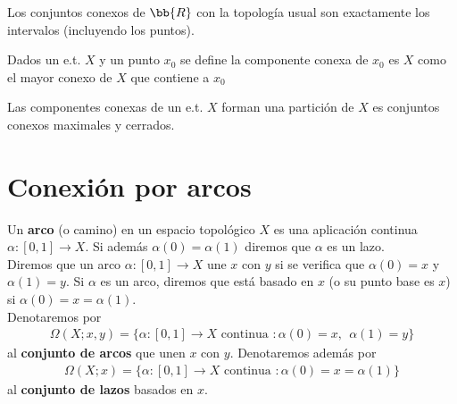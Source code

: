 \begin{teo}
    Los conjuntos conexos de $\bb{R}$ con la topología usual son exactamente los intervalos (incluyendo los puntos).
\end{teo}

\begin{definicion}
    Dados un e.t. $X$ y un punto $x_0$ se define la componente conexa de $x_0$ es $X$ como el mayor conexo de $X$ que contiene a $x_0$
\end{definicion}

\begin{teo}
    Las componentes conexas de un e.t. $X$ forman una partición de $X$ es conjuntos conexos maximales y cerrados.
\end{teo}

\section{Conexión por arcos}

\begin{definicion}
    Un \textbf{arco} (o camino) en un espacio topológico $X$ es una aplicación continua $\alpha:[0,1]\to X$. Si además $\alpha(0) = \alpha(1)$ diremos que $\alpha$ es un lazo.\\

    Diremos que un arco $\alpha:[0,1]\to X$ une $x$ con $y$ si se verifica que $\alpha(0)=x$ y $\alpha(1) = y$. Si $\alpha$ es un arco, diremos que está basado en $x$ (o su punto base es $x$) si $\alpha(0)=x=\alpha(1)$.\\

    Denotaremos por 
    \begin{gather*}
        \Omega(X;x,y) = \{\alpha:[0,1]\to X \text{ continua } : \alpha(0)=x, \ \ \alpha(1)=y\}
    \end{gather*}
    al \textbf{conjunto de arcos} que unen $x$ con $y$. Denotaremos además por  
    \begin{gather*}
        \Omega(X;x) = \{\alpha:[0,1]\to X \text{ continua } : \alpha(0)=x=\alpha(1)\}
    \end{gather*}
    al \textbf{conjunto de lazos} basados en $x$.
\end{definicion}

